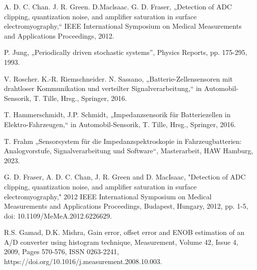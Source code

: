 \begin{thebibliography}{[99]}
	A. D. C. Chan. J. R. Green. D.Maclsaac. G. D. Fraser, „Detection of ADC clipping, quantization noise, and amplifier saturation in surface electromyography,“ IEEE International Symposium on Medical Measurements and Applications Proceedings, 2012.
	
	P. Jung, „Periodically driven stochastic systems”, Physics Reports,  pp. 175-295, 1993.
	
	V. Roscher. K.-R. Riemschneider. N. Sassano, „Batterie-Zellensensoren mit drahtloser Kommunikation und verteilter Signalverarbeitung,“ in Automobil-Sensorik, T. Tille, Hrsg., Springer, 2016.
	
	T. Hammerschmidt, J.P. Schmidt, „Impedanzsensorik für Batteriezellen in Elektro-Fahrzeugen,“ in Automobil-Sensorik, T. Tille, Hrsg., Springer, 2016.
	
	T. Frahm „Sensorsystem für die Impedanzspektroskopie in Fahrzeugbatterien: Analogvorstufe, Signalverarbeitung und Software“, Masterarbeit, HAW Hamburg, 2023.
	
	G. D. Fraser, A. D. C. Chan, J. R. Green and D. MacIsaac, "Detection of ADC clipping, quantization noise, and amplifier saturation in surface electromyography," 2012 IEEE International Symposium on Medical Measurements and Applications Proceedings, Budapest, Hungary, 2012, pp. 1-5, doi: 10.1109/MeMeA.2012.6226629.
	
	R.S. Gamad, D.K. Mishra,
	Gain error, offset error and ENOB estimation of an A/D converter using histogram technique,
	Measurement,
	Volume 42, Issue 4,
	2009,
	Pages 570-576,
	ISSN 0263-2241,
	https://doi.org/10.1016/j.measurement.2008.10.003.

\end{thebibliography}
	

 
 